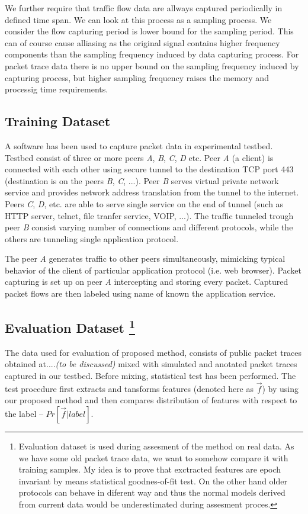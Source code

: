 We further require that traffic flow data are allways captured periodically in defined time span.
We can look at this process as a sampling process. We consider the flow capturing period
is lower bound for the sampling period. This can of course cause alliasing as the original
signal contains higher frequency components than the sampling frequency induced by data capturing 
process. For packet trace data there is no upper bound on the sampling frequency induced by 
capturing process, but higher sampling frequency raises the memory and processig time requirements.

\subsection{Training Dataset}

A  software \cite{jacobson2009tcpdump}  has been used to 
capture packet data in experimental testbed. 
Testbed consist of three or more peers \emph{A}, \emph{B}, \emph{C}, \emph{D}  etc. 
Peer \emph{A} (a client) is connected with each other using secure tunnel 
to the destination TCP port 443 (destination is on the peers \emph{B},  \emph{C}, ...).
Peer \emph{B} serves virtual private network service and provides network address
translation from the tunnel to the internet.
Peers \emph{C}, \emph{D}, etc. are able to serve single service on the end of tunnel 
(such as HTTP server, telnet, file tranfer service, VOIP, ...).
The traffic tunneled trough peer \emph{B} consist varying number of connections 
and different protocols,
while the others are tunneling single application protocol.

The peer \emph{A} generates traffic to other peers simultaneously, 
mimicking typical behavior of the client of particular application protocol 
(i.e. web browser).
Packet capturing is set up on peer \emph{A} intercepting and storing every packet.
Captured packet flows are then labeled using name of known the application service. 

\subsection{Evaluation Dataset%
\footnote{Evaluation dataset is used during 
assesment of the method on real data.
As we have some old packet trace data, we want to somehow compare it with training samples.
My idea is to prove that exctracted features are epoch invariant by means
statistical goodnes-of-fit test.
On the other hand older protocols can behave in diferent way and thus the 
normal models derived from current data would be
underestimated during assesment proces.
}%
}
The data used for evaluation of proposed method, consists of public packet
traces obtained at....\emph{(to be discussed)}
mixed with simulated and anotated packet traces captured in our testbed.
Before mixing, statistical test has been performed.
The test procedure first extracts and tansforms features
(denoted here as $\vec{f}$) by using our proposed method 
and then compares distribution of features with respect to 
the label -- $Pr\left[ \vec{f} | label \right] $.

